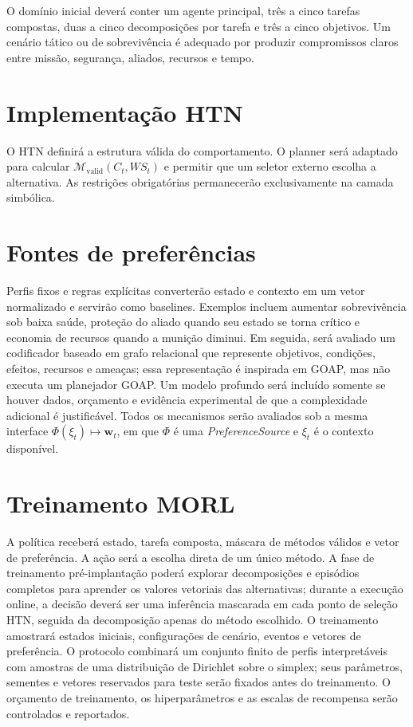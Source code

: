 O domínio inicial deverá conter um agente principal, três a cinco tarefas
compostas, duas a cinco decomposições por tarefa e três a cinco objetivos.
Um cenário tático ou de sobrevivência é adequado por produzir compromissos
claros entre missão, segurança, aliados, recursos e tempo.

\section{Implementação HTN}

O HTN definirá a estrutura válida do comportamento.
O planner será adaptado para calcular $\mathcal{M}_{\mathrm{valid}}(C_t,WS_t)$ e permitir que um
seletor externo escolha a alternativa.
As restrições obrigatórias permanecerão exclusivamente na camada simbólica.

\section{Fontes de preferências}

Perfis fixos e regras explícitas converterão estado e contexto em um vetor
normalizado e servirão como baselines.
Exemplos incluem aumentar sobrevivência sob baixa saúde, proteção do aliado
quando seu estado se torna crítico e economia de recursos quando a munição
diminui.
Em seguida, será avaliado um codificador baseado em grafo relacional que
represente objetivos, condições, efeitos, recursos e ameaças; essa representação
é inspirada em GOAP, mas não executa um planejador GOAP. Um modelo profundo será
incluído somente se houver dados, orçamento e evidência experimental de que a
complexidade adicional é justificável.
Todos os mecanismos serão avaliados sob a mesma interface
$\Phi(\xi_t)\mapsto\mathbf{w}_t$, em que $\Phi$ é uma \textit{PreferenceSource}
e $\xi_t$ é o contexto disponível.

\section{Treinamento MORL}

A política receberá estado, tarefa composta, máscara de métodos válidos e vetor
de preferência.
A ação será a escolha direta de um único método.
A fase de treinamento pré-implantação poderá explorar decomposições e episódios
completos para aprender os valores vetoriais das alternativas; durante a execução
 online, a decisão deverá ser uma inferência mascarada em cada ponto de seleção
 HTN, seguida da decomposição apenas do método escolhido.
O treinamento amostrará estados iniciais, configurações de cenário, eventos e
vetores de preferência.
O protocolo combinará um conjunto finito de perfis interpretáveis com
amostras de uma distribuição de Dirichlet sobre o simplex; seus parâmetros,
sementes e vetores reservados para teste serão fixados antes do treinamento.
O orçamento de treinamento, os hiperparâmetros e as escalas de recompensa serão
controlados e reportados.

